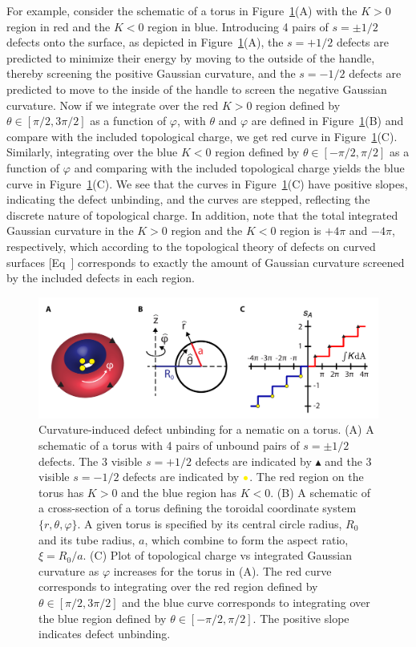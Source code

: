For example, consider the schematic of a torus in Figure~\ref{f:3-EqDefs}(A) with the $K>0$ region in red and the $K<0$ region in blue.
Introducing 4 pairs of $s = \pm 1/2$ defects onto the surface, as depicted in Figure~\ref{f:3-EqDefs}(A), the $s = +1/2$ defects are predicted to minimize their energy by moving to the outside of the handle, thereby screening the positive Gaussian curvature, and the $s = -1/2$ defects are predicted to move to the inside of the handle to screen the negative Gaussian curvature.
Now if we integrate over the red $K>0$ region defined by $\theta \in [\pi/2,3 \pi/2]$ as a function of $\varphi$, with $\theta$ and $\varphi$ are defined in Figure~\ref{f:3-EqDefs}(B) and compare with the included topological charge, we get red curve in Figure~\ref{f:3-EqDefs}(C).
Similarly, integrating over the blue $K<0$ region defined by $\theta \in [-\pi/2,\pi/2]$ as a function of $\varphi$ and comparing with the included topological charge yields the blue curve in Figure~\ref{f:3-EqDefs}(C).
We see that the curves in Figure~\ref{f:3-EqDefs}(C) have positive slopes, indicating the defect unbinding, and the curves are stepped, reflecting the discrete nature of topological charge.
In addition, note that the total integrated Gaussian curvature in the $K>0$ region and the $K<0$ region is $+4 \pi$ and $-4\pi$, respectively, which according to the topological theory of defects on curved surfaces [Eq~] corresponds to exactly the amount of Gaussian curvature screened by the included defects in each region.
\begin{figure}
  \includegraphics{figures/C3/Ch3-Figs_EqDefs.png}
  \caption{Curvature-induced defect unbinding for a nematic on a torus. (A) A schematic of a torus with 4 pairs of unbound pairs of $s = \pm 1/2$ defects. The 3 visible $s=+1/2$ defects are indicated by $\blacktriangle$ and the 3 visible $s = -1/2$ defects are indicated by ${\color{yellow} \bullet}$.
  The red region on the torus has $K >0$ and the blue region has $K<0$.
  (B) A schematic of a cross-section of a torus defining the toroidal coordinate system $\{r, \theta, \varphi \}$.
  A given torus is specified by its central circle radius, $R_0$ and its tube radius, $a$, which combine to form the aspect ratio, $\xi = R_0/a$.
  (C) Plot of topological charge vs integrated Gaussian curvature as $\varphi$ increases for the torus in (A).
  The red curve corresponds to integrating over the red region defined by $\theta \in [\pi/2,3 \pi/2]$ and the blue curve corresponds to integrating over the blue region defined by $\theta \in [-\pi/2,\pi/2]$. The positive slope indicates defect unbinding.}\label{f:3-EqDefs}
\end{figure}

